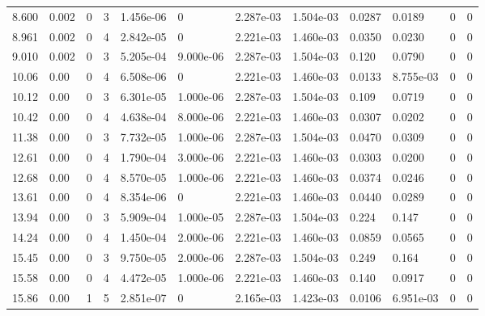 \documentclass[preview]{standalone}
\begin{document}
{{\begin{tabular}{L{1.2cm}C{1.2cm} C{0.3cm}C{0.5cm} C{1.4cm}C{1.4cm} C{1.4cm}C{1.4cm} C{1.6cm}C{1.6cm} C{1.6cm}C{1.6cm}}
  8.600  &  0.002  & 0     &  3 &  1.456e-06  & 0  &  2.287e-03&   1.504e-03& 0.0287 & 0.0189   &  0 & 0  \\ 
  8.961  &  0.002  & 0     &  4 &  2.842e-05  & 0  &  2.221e-03&   1.460e-03& 0.0350 & 0.0230   &  0 & 0  \\ 
  9.010  &  0.002  & 0     &  3 &  5.205e-04  & 9.000e-06  &  2.287e-03&   1.504e-03& 0.120 & 0.0790   &  0 & 0  \\ 
  10.06  &  0.00  & 0     &  4 &  6.508e-06  & 0  &  2.221e-03&   1.460e-03& 0.0133 & 8.755e-03   &  0 & 0  \\ 
  10.12  &  0.00  & 0     &  3 &  6.301e-05  & 1.000e-06  &  2.287e-03&   1.504e-03& 0.109 & 0.0719   &  0 & 0  \\ 
  10.42  &  0.00  & 0     &  4 &  4.638e-04  & 8.000e-06  &  2.221e-03&   1.460e-03& 0.0307 & 0.0202   &  0 & 0  \\ 
  11.38  &  0.00  & 0     &  3 &  7.732e-05  & 1.000e-06  &  2.287e-03&   1.504e-03& 0.0470 & 0.0309   &  0 & 0  \\ 
  12.61  &  0.00  & 0     &  4 &  1.790e-04  & 3.000e-06  &  2.221e-03&   1.460e-03& 0.0303 & 0.0200   &  0 & 0  \\ 
  12.68  &  0.00  & 0     &  4 &  8.570e-05  & 1.000e-06  &  2.221e-03&   1.460e-03& 0.0374 & 0.0246   &  0 & 0  \\ 
  13.61  &  0.00  & 0     &  4 &  8.354e-06  & 0  &  2.221e-03&   1.460e-03& 0.0440 & 0.0289   &  0 & 0  \\ 
  13.94  &  0.00  & 0     &  3 &  5.909e-04  & 1.000e-05  &  2.287e-03&   1.504e-03& 0.224 & 0.147   &  0 & 0  \\ 
  14.24  &  0.00  & 0     &  4 &  1.450e-04  & 2.000e-06  &  2.221e-03&   1.460e-03& 0.0859 & 0.0565   &  0 & 0  \\ 
  15.45  &  0.00  & 0     &  3 &  9.750e-05  & 2.000e-06  &  2.287e-03&   1.504e-03& 0.249 & 0.164   &  0 & 0  \\ 
  15.58  &  0.00  & 0     &  4 &  4.472e-05  & 1.000e-06  &  2.221e-03&   1.460e-03& 0.140 & 0.0917   &  0 & 0  \\ 
  15.86  &  0.00  & 1     &  5 &  2.851e-07  & 0  &  2.165e-03&   1.423e-03& 0.0106 & 6.951e-03   &  0 & 0  \\ 
\hline 
\end{tabular} 

}}
\end{document}
